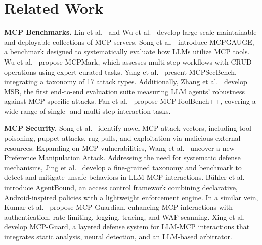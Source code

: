 \section{Related Work}


\textbf{MCP Benchmarks.} Lin et al.~\cite{lin2025large} and Wu et al.~\cite{wu2025mcpzoolargescaledatasetrunnable} develop large-scale maintainable and deployable collections of  MCP servers. 
Song et al.~\cite{song2025help} introduce MCPGAUGE, a benchmark designed to systematically evaluate how LLMs utilize MCP tools. Wu et al.~\cite{wu2025mcpmark} propose MCPMark, which assesses multi-step workflows with CRUD operations using expert-curated tasks. Yang et al.~\cite{yang2025mcpsecbench} present MCPSecBench, integrating a taxonomy of 17 attack types. Additionally, Zhang et al.~\cite{zhang2025mcp} develop MSB, the first end-to-end evaluation suite measuring LLM agents' robustness against MCP-specific attacks. Fan et al.~\cite{fan2025mcptoolbench++} propose MCPToolBench++, covering a wide range of single- and multi-step interaction tasks. %

\textbf{MCP Security.} Song et al.~\cite{song2025beyond} identify novel MCP attack vectors, including tool poisoning, puppet attacks, rug pulls, and exploitation via malicious external resources. Expanding on MCP vulnerabilities, Wang et al.~\cite{wang2025mpma} uncover a new Preference Manipulation Attack. Addressing the need for systematic defense mechanisms, Jing et al.~\cite{jing2025mcip} develop a fine-grained taxonomy and benchmark to detect and mitigate unsafe behaviors in LLM-MCP interactions. Bühler et al.~\cite{buhler2025securing} introduce AgentBound, an access control framework combining declarative, Android-inspired policies with a lightweight enforcement engine. In a similar vein, Kumar et al.~\cite{kumar2025mcp} propose MCP Guardian, enhancing MCP interactions with authentication, rate-limiting, logging, tracing, and WAF scanning. Xing et al.~\cite{xing2025mcp} develop MCP-Guard, a layered defense system for LLM-MCP interactions that integrates static analysis, neural detection, and an LLM-based arbitrator.
